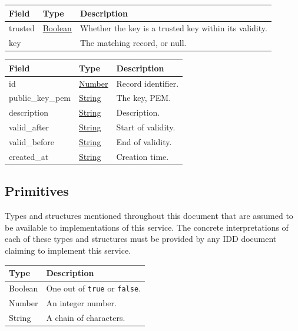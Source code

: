 \documentclass[a4paper]{arrowhead}
\newcommand{\mref}[2][]{{\textcolor{ArrowheadPurple}{\hyperref[sec:model:#2]{\ifstrempty{#1}{#2}{#1}}}}}
\newcommand{\pdef}[1]{{\textcolor{ArrowheadGrey}{#1\label{sec:model:primitives:#1}\label{sec:model:primitives:#1s}\label{sec:model:primitives:#1es}}}}
\newcommand{\pref}[1]{{\textcolor{ArrowheadGrey}{\hyperref[sec:model:primitives:#1]{#1}}}}
\begin{document}




\noindent\begin{tabularx}{\textwidth}{| >{\raggedright\arraybackslash}p{3.9cm} | >{\raggedright\arraybackslash\small}p{5.3cm} | X |} \hline
\rowcolor{gray!33} Field & Type & Description \\ \hline
trusted & \pref{Boolean} & Whether the key is a trusted key within its validity. \\ \hline
key & \mref{TrustedKeyRecord} & The matching record, or null. \\ \hline
\end{tabularx}







\noindent\begin{tabularx}{\textwidth}{| >{\raggedright\arraybackslash}p{3.9cm} | >{\raggedright\arraybackslash\small}p{5.3cm} | X |} \hline
\rowcolor{gray!33} Field & Type & Description \\ \hline
id & \pref{Number} & Record identifier. \\ \hline
public\_key\_pem & \pref{String} & The key, PEM. \\ \hline
description & \pref{String} & Description. \\ \hline
valid\_after & \pref{String} & Start of validity. \\ \hline
valid\_before & \pref{String} & End of validity. \\ \hline
created\_at & \pref{String} & Creation time. \\ \hline
\end{tabularx}



\subsection{Primitives}
\label{sec:model:primitives}

Types and structures mentioned throughout this document that are assumed to be available to implementations of this service.
The concrete interpretations of each of these types and structures must be provided by any IDD document claiming to implement this service.

\noindent\begin{tabularx}{\textwidth}{| p{4.6cm} | X |} \hline
\rowcolor{gray!33} Type & Description \\ \hline
\pdef{Boolean} & One out of \texttt{true} or \texttt{false}. \\ \hline
\pdef{Number} & An integer number. \\ \hline
\pdef{String} & A chain of characters. \\ \hline
\end{tabularx}
\end{document}
